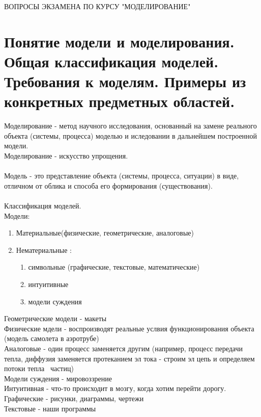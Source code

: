 \documentclass[12pt,a4paper]{article}
\begin{document}
	\newpage
	ВОПРОСЫ ЭКЗАМЕНА ПО КУРСУ "МОДЕЛИРОВАНИЕ"
	\tableofcontents
	\newpage
	\section{Понятие модели и моделирования. Общая классификация моделей. Требования к моделям. Примеры из конкретных предметных областей.}
	Моделирование - метод научного исследования, основанный на замене реального объекта (системы, процесса) моделью и иследовании в дальнейшем построенной модели.\\
	Моделирование - искусство упрощения.\\
	\\
	Модель - это представление объекта (системы, процесса, ситуации) в виде, отличном от облика и способа его формирования (существования).\\
	\\
	Классификация моделей.\\
	Модели:\\
	\begin{enumerate}
		\item Материальные(физические, геометрические, аналоговые) \\
		\item Нематериальные :\\
		\begin{enumerate}
			\item символьные (графические, текстовые, математические) \\
			\item интуитивные\\
			\item модели суждения\\
		\end{enumerate}
	\end{enumerate}
	Геометрические модели - макеты \\
	Физические мдели - воспроизводят реальные услвия функционирования объекта (модель самолета в аэротрубе)\\	
	Аналоговые - один процесс заменяется другим (например, процесс передачи тепла, диффузия заменяется протеканием  эл тока - строим эл цепь и определяем потоки тепла \ частиц) \\	
	Модели суждения - мировоззрение\\	
	Интуитивная - что-то происходит в мозгу, когда хотим перейти дорогу. \\	
	Графические - рисунки, диаграммы, чертежи\\	
	Текстовые - наши программы\\
	
\end{document}
